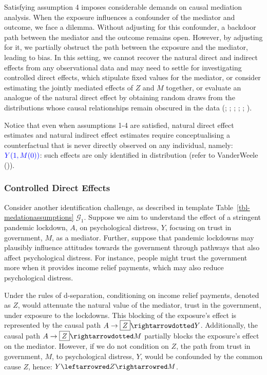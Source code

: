 \documentclass[
  single column]{article}
\begin{document}
Satisfying assumption 4 imposes considerable demands on causal mediation
analysis. When the exposure influences a confounder of the mediator and
outcome, we face a dilemma. Without adjusting for this confounder, a
backdoor path between the mediator and the outcome remains open.
However, by adjusting for it, we partially obstruct the path between the
exposure and the mediator, leading to bias. In this setting, we cannot
recover the natural direct and indirect effects from any observational
data and may need to settle for investigating controlled direct effects,
which stipulate fixed values for the mediator, or consider estimating
the jointly mediated effects of \(Z\) and \(M\) together, or evaluate an
analogue of the natural direct effect by obtaining random draws from the
distributions whose causal relationships remain obscured in the data
(;
;
;
;
; ).

Notice that even when assumptions 1-4 are satisfied, natural direct
effect estimates and natural indirect effect estimates require
conceptualising a counterfactual that is never directly observed on any
individual, namely: \(\textcolor{blue}{Y(1, M(0))}\): such effects are
only identified in distribution (refer to VanderWeele
()).

\subsubsection{Controlled Direct
Effects}\label{controlled-direct-effects}

Consider another identification challenge, as described in template
Table~\ref{tbl-medationassumptions} \(\mathcal{G}_1\). Suppose we aim to
understand the effect of a stringent pandemic lockdown, \(A\), on
psychological distress, \(Y\), focusing on trust in government, \(M\),
as a mediator. Further, suppose that pandemic lockdowns may plausibly
influence attitudes towards the government through pathways that also
affect psychological distress. For instance, people might trust the
government more when it provides income relief payments, which may also
reduce psychological distress.

Under the rules of d-separation, conditioning on income relief payments,
denoted as \(Z\), would attenuate the natural value of the mediator,
trust in the government, under exposure to the lockdowns. This blocking
of the exposure's effect is represented by the causal path
\(A \to \boxed{Z} \rightarrowdotted Y\). Additionally, the causal path
\(A \to \boxed{Z} \rightarrowdotted M\) partially blocks the exposure's
effect on the mediator. However, if we do not condition on \(Z\), the
path from trust in government, \(M\), to psychological distress, \(Y\),
would be confounded by the common cause \(Z\), hence:
\(Y \leftarrowred Z \rightarrowred M\).
\end{document}
